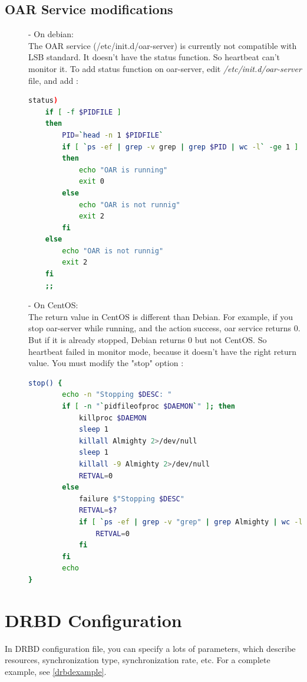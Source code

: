 \documentclass[a4paper,10pt]{report}
\begin{document}
\subsection{OAR Service modifications}
\begin{description}
\item[]- On debian:\\

The OAR service (/etc/init.d/oar-server) is currently not compatible with LSB standard. It doesn't have the status function. So heartbeat can't monitor it.
To add status function on oar-server, edit \textit{/etc/init.d/oar-server} file, and add :
\begin{lstlisting}[language=bash]
status)
	if [ -f $PIDFILE ]
	then
		PID=`head -n 1 $PIDFILE`
		if [ `ps -ef | grep -v grep | grep $PID | wc -l` -ge 1 ]
		then
			echo "OAR is running"
			exit 0
		else
			echo "OAR is not runnig"
			exit 2
		fi
	else
		echo "OAR is not runnig"
		exit 2
	fi
	;;
\end{lstlisting}

\item[]- On CentOS:\\

The return value in CentOS is different than Debian. For example, if you stop oar-server while running, and the action success, oar service returns 0. But if it is already stopped, Debian returns 0 but not CentOS. So heartbeat failed in monitor mode, because it doesn't have the right return value.
You must modify the "stop" option :
\begin{lstlisting}[language=bash]
stop() {
        echo -n "Stopping $DESC: "
        if [ -n "`pidfileofproc $DAEMON`" ]; then
            killproc $DAEMON
            sleep 1
            killall Almighty 2>/dev/null
            sleep 1
            killall -9 Almighty 2>/dev/null
            RETVAL=0
        else
            failure $"Stopping $DESC"
            RETVAL=$?
            if [ `ps -ef | grep -v "grep" | grep Almighty | wc -l` -eq 0 ]; then
                RETVAL=0
            fi
        fi
        echo 
}
\end{lstlisting}
\end{description}

\section{DRBD Configuration}
In DRBD configuration file, you can specify a lots of parameters, which describe resources, synchronization type, synchronization rate, etc. For a complete example, see \ref{drbdexample}.
\end{document}
